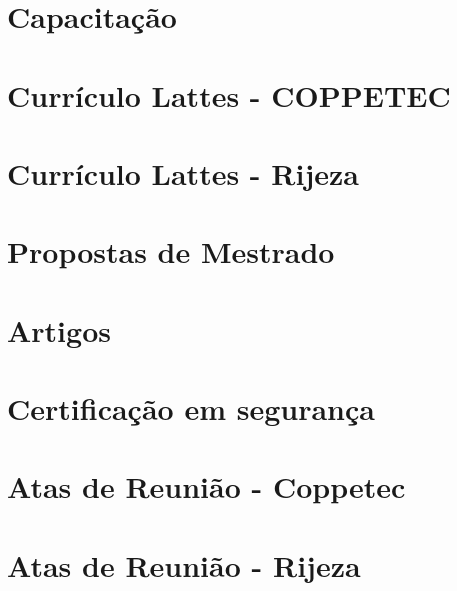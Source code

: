 \documentclass[a4paper,10pt,oneside,brazilian,
draft=false]{report}%
\begin{document}
\chapter{Capacitação}


\chapter{Currículo Lattes - COPPETEC}








\chapter{Currículo Lattes - Rijeza}









\chapter{Propostas de Mestrado}
\label{app::propostas}





\label{app:artigos}
\chapter{Artigos}



\chapter{Certificação em segurança}


\chapter{Atas de Reunião - Coppetec}


\chapter{Atas de Reunião - Rijeza}

\end{document}
